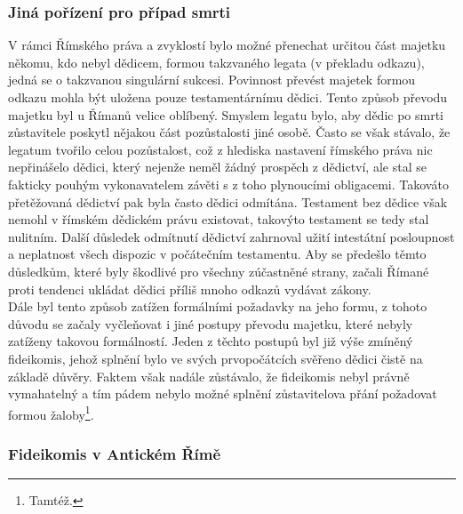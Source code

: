 \documentclass{article}
\begin{document}
\newpage

\subsubsection{Jiná pořízení pro případ smrti}

V rámci Římského práva a zvyklostí bylo možné přenechat určitou část majetku někomu, kdo nebyl dědicem, formou takzvaného legata (v překladu odkazu), jedná se o takzvanou singulární sukcesi. Povinnost převést majetek formou odkazu mohla být uložena pouze testamentárnímu dědici. Tento způsob převodu majetku byl u Římanů velice oblíbený. Smyslem legatu bylo, aby dědic po smrti zůstavitele poskytl nějakou část pozůstalosti jiné osobě. Často se však stávalo, že legatum tvořilo celou pozůstalost, což z hlediska nastavení římského práva nic nepřinášelo dědici, který nejenže neměl žádný prospěch z dědictví, ale stal se fakticky pouhým vykonavatelem závěti s z toho plynoucími obligacemi. Takováto přetěžovaná dědictví pak byla často dědici odmítána. Testament bez dědice však nemohl v římském dědickém právu existovat, takovýto testament se tedy stal nulitním. Další důsledek odmítnutí dědictví zahrnoval užití intestátní posloupnost a neplatnost všech dispozic v počátečním testamentu. Aby se předešlo těmto důsledkům, které byly škodlivé pro všechny zúčastněné strany, začali Římané proti tendenci ukládat dědici příliš mnoho odkazů vydávat zákony.\\


Dále byl tento způsob zatížen formálními požadavky na jeho formu, z tohoto důvodu se začaly vyčleňovat i jiné postupy převodu majetku, které nebyly zatíženy takovou formálností. Jeden z těchto postupů byl již výše zmíněný fideikomis, jehož splnění bylo ve svých prvopočátcích svěřeno dědici čistě na základě důvěry. Faktem však nadále zůstávalo, že fideikomis nebyl právně vymahatelný a tím pádem nebylo možné splnění zůstavitelova přání požadovat formou žaloby\footnote{Tamtéž.}.\\


\subsubsection{Fideikomis v Antickém Římě}
\end{document}
